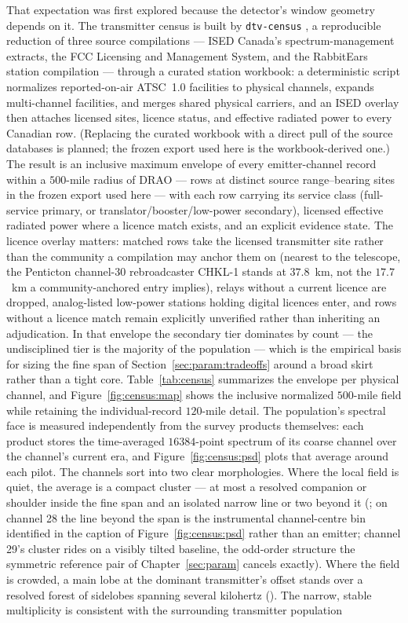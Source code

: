That expectation was first explored because the detector's window geometry depends on it. The transmitter census is built by \texttt{dtv-census} \cite{dtv-census}, a reproducible reduction of three source compilations --- ISED Canada's spectrum-management extracts, the FCC Licensing and Management System, and the RabbitEars station compilation \cite{fcc-lms} --- through a curated station workbook: a deterministic script normalizes reported-on-air ATSC~1.0 facilities to physical channels, expands multi-channel facilities, and merges shared physical carriers, and an ISED overlay then attaches licensed sites, licence status, and effective radiated power to every Canadian row. (Replacing the curated workbook with a direct pull of the source databases is planned; the frozen export used here is the workbook-derived one.) The result is an inclusive maximum envelope of every emitter-channel record within a $500$-mile radius of DRAO ---  rows at  distinct source range--bearing sites in the frozen export used here --- with each row carrying its service class (full-service primary, or translator/booster/low-power secondary), licensed effective radiated power where a licence match exists, and an explicit evidence state. The licence overlay matters: matched rows take the licensed transmitter site rather than the community a compilation may anchor them on (nearest to the telescope, the Penticton channel-30 rebroadcaster CHKL-1 stands at $37.8$~km, not the $17.7$~km a community-anchored entry implies), relays without a current licence are dropped, analog-listed low-power stations holding digital licences enter, and rows without a licence match remain explicitly unverified rather than inheriting an adjudication. In that envelope the secondary tier dominates by count --- the undisciplined tier is the majority of the population --- which is the empirical basis for sizing the fine span of Section~\ref{sec:param:tradeoffs} around a broad skirt rather than a tight core. Table~\ref{tab:census} summarizes the envelope per physical channel, and Figure~\ref{fig:census:map} shows the inclusive normalized $500$-mile field while retaining the individual-record $120$-mile detail. The population's spectral face is measured independently from the survey products themselves: each product stores the time-averaged $16384$-point spectrum of its coarse channel over the channel's current era, and Figure~\ref{fig:census:psd} plots that average around each pilot. The channels sort into two clear morphologies. Where the local field is quiet, the average is a compact cluster --- at most a resolved companion or shoulder inside the fine span and an isolated narrow line or two beyond it (; on channel 28 the line beyond the span is the instrumental channel-centre bin identified in the caption of Figure~\ref{fig:census:psd} rather than an emitter; channel 29's cluster rides on a visibly tilted baseline, the odd-order structure the symmetric reference pair of Chapter~\ref{sec:param} cancels exactly). Where the field is crowded, a main lobe at the dominant transmitter's offset stands over a resolved forest of sidelobes spanning several kilohertz (). The narrow, stable multiplicity is consistent with the surrounding transmitter population 